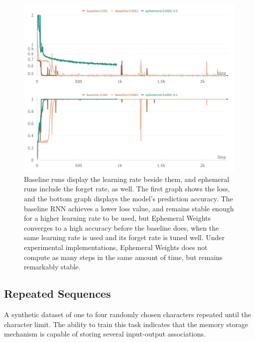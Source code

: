 \documentclass{article} %
\begin{document}
\begin{figure}[h]
\begin{center}
\includegraphics[width=0.8\linewidth]{figure_1.png}
\caption{Baseline runs display the learning rate beside them, and ephemeral runs include the forget rate, as well. The first graph shows the loss, and the bottom graph displays the model's prediction accuracy. The baseline RNN achieves a lower loss value, and remains stable enough for a higher learning rate to be used, but Ephemeral Weights converges to a high accuracy before the baseline does, when the same learning rate is used and its forget rate is tuned well. Under experimental implementations, Ephemeral Weights does not compute as many steps in the same amount of time, but remains remarkably stable.}
\label{fig:key_recall}
\end{center}
\end{figure}

\subsection{Repeated Sequences}
A synthetic dataset of one to four randomly chosen characters repeated until the character limit. The ability to train this task indicates that the memory storage mechanism is capable of storing several input-output associations. 
\end{document}
